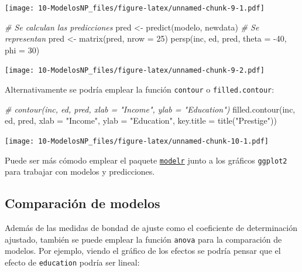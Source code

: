 \documentclass[
]{book}
\newenvironment{Shaded}{\begin{snugshade}}{\end{snugshade}}
\newcommand{\AttributeTok}[1]{\textcolor[rgb]{0.77,0.63,0.00}{#1}}
\newcommand{\CommentTok}[1]{\textcolor[rgb]{0.56,0.35,0.01}{\textit{#1}}}
\newcommand{\DecValTok}[1]{\textcolor[rgb]{0.00,0.00,0.81}{#1}}
\newcommand{\FunctionTok}[1]{\textcolor[rgb]{0.00,0.00,0.00}{#1}}
\newcommand{\NormalTok}[1]{#1}
\newcommand{\OtherTok}[1]{\textcolor[rgb]{0.56,0.35,0.01}{#1}}
\newcommand{\SpecialCharTok}[1]{\textcolor[rgb]{0.00,0.00,0.00}{#1}}
\newcommand{\StringTok}[1]{\textcolor[rgb]{0.31,0.60,0.02}{#1}}
\theoremstyle{break}
\begin{document}
\texttt{[image: 10-ModelosNP\_files/figure-latex/unnamed-chunk-9-1.pdf]}

\begin{Shaded}
\begin{Highlighting}[]
\CommentTok{\# Se calculan las predicciones}
\NormalTok{pred }\OtherTok{\textless{}{-}} \FunctionTok{predict}\NormalTok{(modelo, newdata)}
\CommentTok{\# Se representan}
\NormalTok{pred }\OtherTok{\textless{}{-}} \FunctionTok{matrix}\NormalTok{(pred, }\AttributeTok{nrow =} \DecValTok{25}\NormalTok{)}
\FunctionTok{persp}\NormalTok{(inc, ed, pred, }\AttributeTok{theta =} \SpecialCharTok{{-}}\DecValTok{40}\NormalTok{, }\AttributeTok{phi =} \DecValTok{30}\NormalTok{)}
\end{Highlighting}
\end{Shaded}

\texttt{[image: 10-ModelosNP\_files/figure-latex/unnamed-chunk-9-2.pdf]}

Alternativamente se podría emplear la función \texttt{contour} o \texttt{filled.contour}:

\begin{Shaded}
\begin{Highlighting}[]
\CommentTok{\# contour(inc, ed, pred, xlab = "Income", ylab = "Education")}
\FunctionTok{filled.contour}\NormalTok{(inc, ed, pred, }\AttributeTok{xlab =} \StringTok{"Income"}\NormalTok{, }\AttributeTok{ylab =} \StringTok{"Education"}\NormalTok{, }\AttributeTok{key.title =} \FunctionTok{title}\NormalTok{(}\StringTok{"Prestige"}\NormalTok{))}
\end{Highlighting}
\end{Shaded}

\texttt{[image: 10-ModelosNP\_files/figure-latex/unnamed-chunk-10-1.pdf]}

Puede ser más cómodo emplear el paquete \href{https://github.com/hadley/modelr}{\texttt{modelr}} junto a los gráficos \texttt{ggplot2} para trabajar con modelos y predicciones.

\hypertarget{comparaciuxf3n-de-modelos}{%
\subsection{Comparación de modelos}\label{comparaciuxf3n-de-modelos}}

Además de las medidas de bondad de ajuste como el coeficiente de determinación ajustado, también se puede emplear la función \texttt{anova} para la comparación de modelos.
Por ejemplo, viendo el gráfico de los efectos se podría pensar que el efecto de \texttt{education} podría ser lineal:
\end{document}
